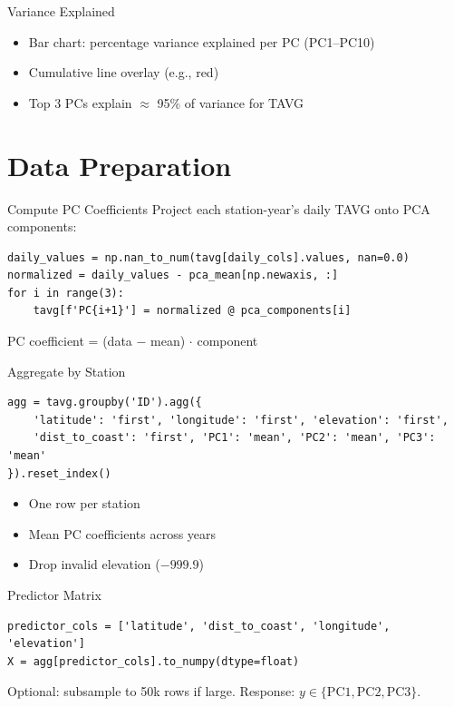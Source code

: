 \documentclass{beamer}
\begin{document}
\begin{frame}{Variance Explained}
\begin{itemize}
\item Bar chart: percentage variance explained per PC (PC1--PC10)
\item Cumulative line overlay (e.g., red)
\item Top 3 PCs explain $\approx$ 95\% of variance for TAVG
\end{itemize}
\vspace{0.3em}
\end{frame}

\section{Data Preparation}

\begin{frame}{Compute PC Coefficients}
Project each station-year's daily TAVG onto PCA components:
\begin{lstlisting}
daily_values = np.nan_to_num(tavg[daily_cols].values, nan=0.0)
normalized = daily_values - pca_mean[np.newaxis, :]
for i in range(3):
    tavg[f'PC{i+1}'] = normalized @ pca_components[i]
\end{lstlisting}
PC coefficient = (data $-$ mean) $\cdot$ component
\end{frame}

\begin{frame}{Aggregate by Station}
\begin{lstlisting}
agg = tavg.groupby('ID').agg({
    'latitude': 'first', 'longitude': 'first', 'elevation': 'first',
    'dist_to_coast': 'first', 'PC1': 'mean', 'PC2': 'mean', 'PC3': 'mean'
}).reset_index()
\end{lstlisting}
\begin{itemize}
\item One row per station
\item Mean PC coefficients across years
\item Drop invalid elevation ($-999.9$)
\end{itemize}
\end{frame}

\begin{frame}{Predictor Matrix}
\begin{lstlisting}
predictor_cols = ['latitude', 'dist_to_coast', 'longitude', 'elevation']
X = agg[predictor_cols].to_numpy(dtype=float)
\end{lstlisting}
Optional: subsample to 50k rows if large. Response: $y \in \{\mathrm{PC1}, \mathrm{PC2}, \mathrm{PC3}\}$.
\end{frame}
\end{document}

